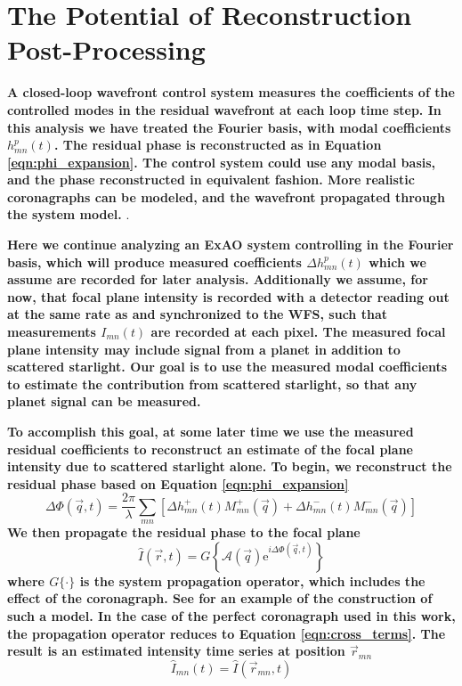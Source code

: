 \documentclass[10pt,preprint]{aastex631}
\begin{document}
\section{The Potential of Reconstruction Post-Processing}
\label{sec:reconstruction}
\textbf{A closed-loop wavefront control system measures the coefficients of the controlled modes in the residual wavefront at each loop time step.  In this analysis we have treated the Fourier basis, with modal coefficients $h_{mn}^{p}(t)$.   The residual phase is reconstructed as in Equation \ref{eqn:phi_expansion}.  The control system could use any modal basis, and the phase reconstructed in equivalent fashion. More realistic coronagraphs can be modeled, and the wavefront propagated through the system model.  }.

\textbf{Here we continue analyzing an ExAO system controlling in the Fourier basis, which will produce measured coefficients $\Delta h_{mn}^{p}(t)$ which we assume are recorded for later analysis.  Additionally we assume, for now, that focal plane intensity is recorded with a detector reading out at the same rate as and synchronized to the WFS, such that measurements $I_{mn}(t)$ are recorded at each pixel. The measured focal plane intensity may include signal from a planet in addition to scattered starlight. Our goal is to use the measured modal coefficients to estimate the contribution from scattered starlight, so that any planet signal can be measured.}  

\textbf{To accomplish this goal, at some later time we use the measured residual coefficients to reconstruct an estimate of the focal plane intensity due to scattered starlight alone.  To begin, we reconstruct the residual phase based on Equation \ref{eqn:phi_expansion} }
\begin{equation}
\Delta\Phi(\vec{q},t) = \frac{2\pi}{\lambda} \sum\limits_{mn} \left[ \Delta h_{mn}^{+}(t) M_{mn}^{+}(\vec{q}) + \Delta h_{mn}^{-}(t) M_{mn}^{-}(\vec{q})\right]
\label{eqn:phi_residual}
\end{equation}
\textbf{We then propagate the residual phase to the focal plane}
\begin{equation}
\hat{I}(\vec{r},t) = G \left\{\mathcal{A}(\vec{q}) \mbox{e}^{i\Delta\Phi(\vec{q},t)} \right\}
\end{equation}
\textbf{where $G\{\cdot\}$ is the system propagation operator, which includes the effect of the coronagraph.  See \citet{2017MNRAS.467L.105H} for an example of the construction of such a model. In the case of the perfect coronagraph used in this work, the propagation operator reduces to  Equation \ref{eqn:cross_terms}. The result is an estimated intensity time series at position $\vec{r}_{mn}$ }
\begin{equation}
\hat{I}_{mn}(t) = \hat{I}(\vec{r}_{mn},t)
\end{equation}
\end{document}
